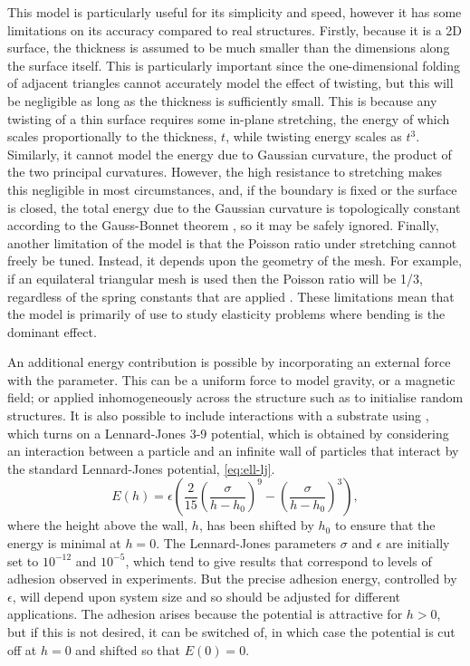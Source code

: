 This model is particularly useful for its simplicity and speed, however it has some limitations on its accuracy compared to real structures.
Firstly, because it is a 2D surface, the thickness is assumed to be much smaller than the dimensions along the surface itself.
This is particularly important since the one-dimensional folding of adjacent triangles cannot accurately model the effect of twisting, but this will be negligible as long as the thickness is sufficiently small.
This is because any twisting of a thin surface requires some in-plane stretching, the energy of which scales proportionally to the thickness, $t$, while twisting energy scales as $t^3$.
Similarly, it cannot model the energy due to Gaussian curvature, the product of the two principal curvatures.
However, the high resistance to stretching makes this negligible in most circumstances, and, if the boundary is fixed or the surface is closed, the total energy due to the Gaussian curvature is topologically constant according to the Gauss-Bonnet theorem \cite{Rueda-Contreras2021}, so it may be safely ignored.
Finally, another limitation of the model is that the Poisson ratio under stretching cannot freely be tuned.
Instead, it depends upon the geometry of the mesh.
For example, if an equilateral triangular mesh is used then the Poisson ratio will be 1/3, regardless of the spring constants that are applied \cite{Gelder1998}.
These limitations mean that the model is primarily of use to study elasticity problems where bending is the dominant effect.

An additional energy contribution is possible by incorporating an external force with the  parameter.
This can be a uniform force to model gravity, or a magnetic field; or applied inhomogeneously across the structure such as to initialise random structures.
It is also possible to include interactions with a substrate using , which turns on a Lennard-Jones 3-9 potential, which is obtained by considering an interaction between a particle and an infinite wall of particles that interact by the standard Lennard-Jones potential, \cref{eq:ell-lj}.
\begin{equation}
  E(h) = \epsilon \left( \frac{2}{15}\left(\frac{\sigma}{h-h_0}\right)^9 - \left(\frac{\sigma}{h-h_0}\right)^3 \right),
\end{equation}
where the height above the wall, $h$, has been shifted by $h_0$ to ensure that the energy is minimal at $h=0$.
The Lennard-Jones parameters $\sigma$ and $\epsilon$ are initially set to $10^{-12}$ and $10^{-5}$, which tend to give results that correspond to levels of adhesion observed in experiments.
But the precise adhesion energy, controlled by $\epsilon$, will depend upon system size and so should be adjusted for different applications.
The adhesion arises because the potential is attractive for $h>0$, but if this is not desired, it can be switched of, in which case the potential is cut off at $h=0$ and shifted so that $E(0)=0$.


